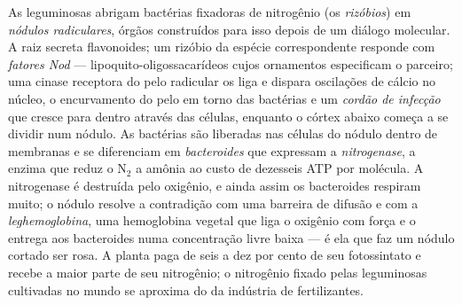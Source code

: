 \begin{definition}\label{def:b3:microbiomes:nodule}
As leguminosas abrigam bactérias fixadoras de nitrogênio (os
\emph{rizóbios}) em \emph{nódulos radiculares}, órgãos construídos para
isso depois de um diálogo molecular. A raiz secreta flavonoides; um
rizóbio da espécie correspondente responde com \emph{fatores Nod} ---
lipoquito-oligossacarídeos cujos ornamentos especificam o parceiro; uma
cinase receptora do pelo radicular os liga e dispara oscilações de
cálcio no núcleo, o encurvamento do pelo em torno das bactérias e um
\emph{cordão de infecção} que cresce para dentro através das células,
enquanto o córtex abaixo começa a se dividir num nódulo. As bactérias
são liberadas nas células do nódulo dentro de membranas e se
diferenciam em \emph{bacteroides} que expressam a \emph{nitrogenase}, a
enzima que reduz o N$_{2}$ a amônia ao custo de dezesseis ATP por
molécula. A nitrogenase é destruída pelo oxigênio, e ainda assim os
bacteroides respiram muito; o nódulo resolve a contradição com uma
barreira de difusão e com a \emph{leghemoglobina}, uma hemoglobina
vegetal que liga o oxigênio com força e o entrega aos bacteroides numa
concentração livre baixa --- é ela que faz um nódulo cortado ser rosa.
A planta paga de seis a dez por cento de seu fotossintato e recebe a
maior parte de seu nitrogênio; o nitrogênio fixado pelas leguminosas
cultivadas no mundo se aproxima do da indústria de fertilizantes.
\end{definition}

